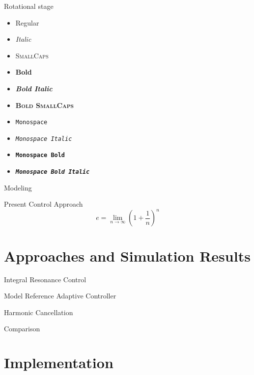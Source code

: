 \documentclass[10pt]{beamer}
\begin{document}
\begin{frame}{Rotational stage}
  \begin{itemize}
    \item Regular
    \item \textit{Italic}
    \item \textsc{SmallCaps}
    \item \textbf{Bold}
    \item \textbf{\textit{Bold Italic}}
    \item \textbf{\textsc{Bold SmallCaps}}
    \item \texttt{Monospace}
    \item \texttt{\textit{Monospace Italic}}
    \item \texttt{\textbf{Monospace Bold}}
    \item \texttt{\textbf{\textit{Monospace Bold Italic}}}
  \end{itemize}
\end{frame}

\begin{frame}{Modeling}
\end{frame}

\begin{frame}{Present Control Approach}
  \begin{equation*}
    e = \lim_{n\to \infty} \left(1 + \frac{1}{n}\right)^n
  \end{equation*}
\end{frame}

\section{Approaches and Simulation Results}

\begin{frame}{Integral Resonance Control}
\end{frame}

\begin{frame}{Model Reference Adaptive Controller}
\end{frame}

\begin{frame}{Harmonic Cancellation}
\end{frame}

\begin{frame}{Comparison}
\end{frame}

\section{Implementation}
\end{document}
